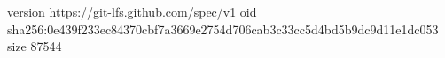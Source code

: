 version https://git-lfs.github.com/spec/v1
oid sha256:0e439f233ec84370cbf7a3669e2754d706cab3c33cc5d4bd5b9dc9d11e1dc053
size 87544

